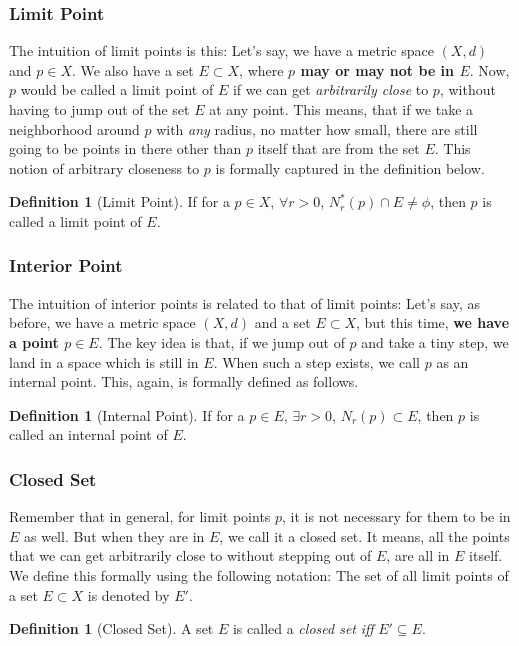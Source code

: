 \documentclass{report}
\theoremstyle{plain}
\theoremstyle{definition}
\newtheorem{definition}[theorem]{Definition} %
\begin{document}
\subsubsection{Limit Point}
The intuition of limit points is this: Let's say, we have a metric space $(X,d)$ and $p\in X$. We also have a set $E\subset X$, where \textbf{$p$ may or may not be in $E$}. Now, $p$ would be called a limit point of $E$ if we can get \emph{arbitrarily close} to $p$, without having to jump out of the set $E$ at any point. This means, that if we take a neighborhood around $p$ with \emph{any} radius, no matter how small, there are still going to be points in there other than $p$ itself that are from the set $E$. This notion of arbitrary closeness to $p$ is formally captured in the definition below.
\begin{definition}[Limit Point]
If for a $p\in X$, $\forall r>0$, $N^*_r(p)\cap E\neq \phi$, then $p$ is called a limit point of $E$.
\end{definition}
\subsubsection{Interior Point}
The intuition of interior points is related to that of limit points: Let's say, as before, we have a metric space $(X,d)$ and a set $E\subset X$, but this time, \textbf{we have a point $p\in E$}. The key idea is that, if we jump out of $p$ and take a tiny step, we land in a space which is still in $E$. When such a step exists, we call $p$ as an internal point. This, again, is formally defined as follows.
\begin{definition}[Internal Point]
If for a $p\in E$, $\exists r>0$, $N_r(p)\subset E$, then $p$ is called an internal point of $E$.
\end{definition}
\subsubsection{Closed Set}
Remember that in general, for limit points $p$, it is not necessary for them to be in $E$ as well. But when they are in $E$, we call it a closed set. It means, all the points that we can get arbitrarily close to without stepping out of $E$, are all in $E$ itself. We define this formally using the following notation: The set of all limit points of a set $E\subset X$ is denoted by $E'$.
\begin{definition}[Closed Set]
A set $E$ is called a \emph{closed set} \emph{iff} $E'\subseteq E$.
\end{definition}
\end{document}
